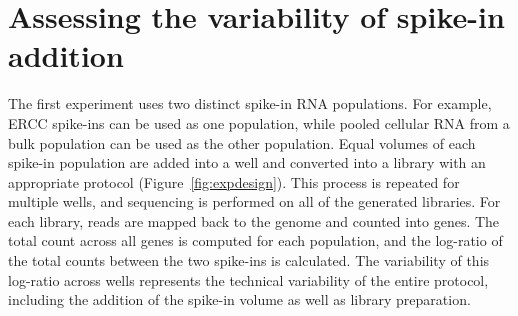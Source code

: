 \documentclass{article}
\begin{document}
% 

\section{Assessing the variability of spike-in addition}
The first experiment uses two distinct spike-in RNA populations.
For example, ERCC spike-ins can be used as one population, while pooled cellular RNA from a bulk population can be used as the other population.
Equal volumes of each spike-in population are added into a well and converted into a library with an appropriate protocol (Figure~\ref{fig:expdesign}).
This process is repeated for multiple wells, and sequencing is performed on all of the generated libraries.
For each library, reads are mapped back to the genome and counted into genes.
The total count across all genes is computed for each population, and the log-ratio of the total counts between the two spike-ins is calculated.
The variability of this log-ratio across wells represents the technical variability of the entire protocol, including the addition of the spike-in volume as well as library preparation.

\end{document}
